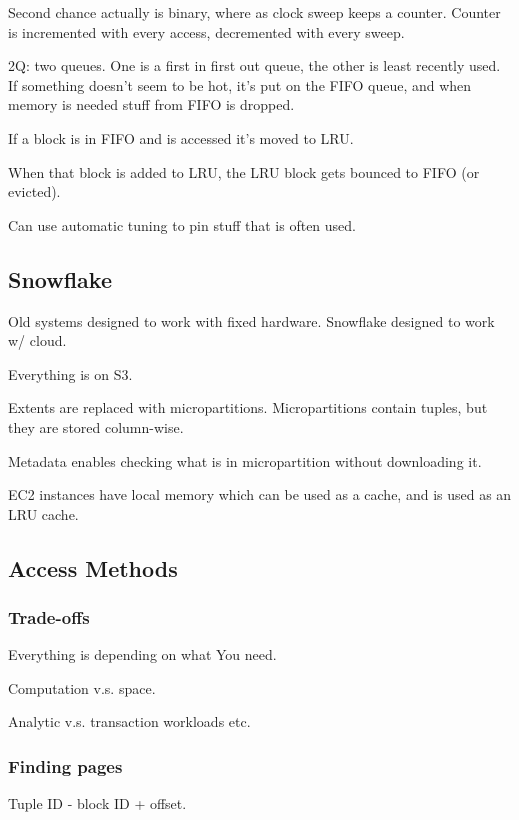 \documentclass{article}
\begin{document}
			Second chance actually is binary, where as clock sweep keeps a counter. Counter is incremented with every access, decremented with every sweep. 
			
			2Q: two queues. One is a first in first out queue, the other is least recently used. If something doesn't seem to be hot, it's put on the FIFO queue, and when memory is needed stuff from FIFO is dropped. 
			
			If a block is in FIFO and is accessed it's moved to LRU.
			
			When that block is added to LRU, the LRU block gets bounced to FIFO (or evicted).
			
			Can use automatic tuning to pin stuff that is often used.
			
		\subsection{Snowflake}
		
			Old systems designed to work with fixed hardware. Snowflake designed to work w/ cloud.
			
			Everything is on S3.
			
			Extents are replaced with micropartitions. Micropartitions contain tuples, but they are stored column-wise.
			
			Metadata enables checking what is in micropartition without downloading it.
			
			EC2 instances have local memory which can be used as a cache, and is used as an LRU cache.
			
		\subsection{Access Methods}
		
			\subsubsection{Trade-offs}
			
				Everything is depending on what You need.
				
				Computation v.s. space.
				
				Analytic v.s. transaction workloads etc.
				
			\subsubsection{Finding pages}
			
				Tuple ID - block ID + offset.
				
\end{document}
